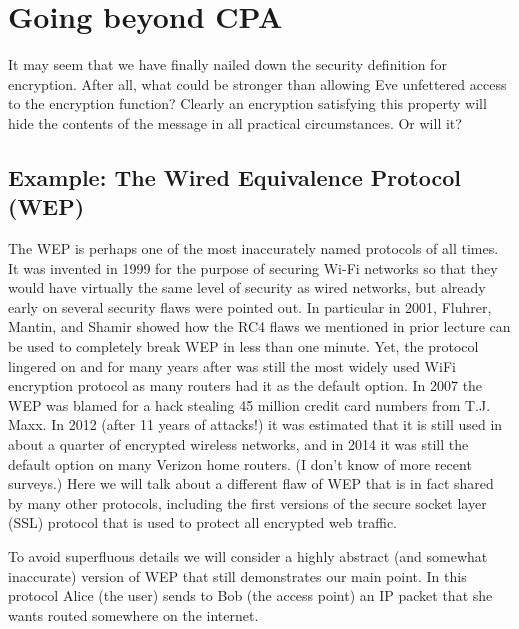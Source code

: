 \section{Going beyond CPA}\label{6-Going-beyond-CPA}

It may seem that we have finally nailed down the security definition for
encryption. After all, what could be stronger than allowing Eve
unfettered access to the encryption function? Clearly an encryption
satisfying this property will hide the contents of the message in all
practical circumstances. Or will it?


\subsection{Example: The Wired Equivalence Protocol
(WEP)}\label{6-Example-The-Wired-Equi}

The WEP is perhaps one of the most inaccurately named protocols of all
times. It was invented in 1999 for the purpose of securing Wi-Fi
networks so that they would have virtually the same level of security as
wired networks, but already early on several security flaws were pointed
out. In particular in 2001, Fluhrer, Mantin, and Shamir showed how the
RC4 flaws we mentioned in prior lecture can be used to completely break
WEP in less than one minute. Yet, the protocol lingered on and for many
years after was still the most widely used WiFi encryption protocol as
many routers had it as the default option. In 2007 the WEP was blamed
for a hack stealing 45 million credit card numbers from T.J. Maxx. In
2012 (after 11 years of attacks!) it was estimated that it is still used
in about a quarter of encrypted wireless networks, and in 2014 it was
still the default option on many Verizon home routers. (I don't know of
more recent surveys.) Here we will talk about a different flaw of WEP
that is in fact shared by many other protocols, including the first
versions of the secure socket layer (SSL) protocol that is used to
protect all encrypted web traffic.

To avoid superfluous details we will consider a highly abstract (and
somewhat inaccurate) version of WEP that still demonstrates our main
point. In this protocol Alice (the user) sends to Bob (the access point)
an IP packet that she wants routed somewhere on the internet.

